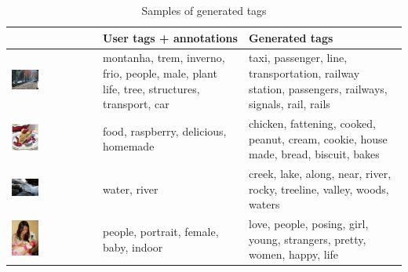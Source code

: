 \documentclass{article} %
\begin{document}
\begin{table}[h]
\begin{tabular} {l | b{3.7cm} | b{3.7cm}}
  & User tags + annotations & Generated tags \\
 \hline
 \includegraphics[width=0.33\textwidth, height=0.12\textheight]{track.jpg} & montanha, trem, inverno, frio, people, male, plant life, tree, structures, transport, car & taxi, passenger, line, transportation, railway station, passengers, railways, signals, rail, rails \\
 \includegraphics[width=0.33\textwidth, height=0.12\textheight]{cake.jpg} & food, raspberry, delicious, homemade & chicken, fattening, cooked, peanut, cream, cookie, house made, bread, biscuit, bakes \\

 \includegraphics[width=0.33\textwidth, height=0.12\textheight]{river.jpg} & water, river & creek, lake, along, near, river, rocky, treeline, valley, woods, waters \\

 \includegraphics[width=0.33\textwidth, height=0.12\textheight]{baby.jpg} & people, portrait, female, baby, indoor & love, people, posing, girl, young, strangers, pretty, women, happy, life \\
\end{tabular}
\label{table:samples}
\caption{Samples of generated tags}
\end{table}
\end{document}
